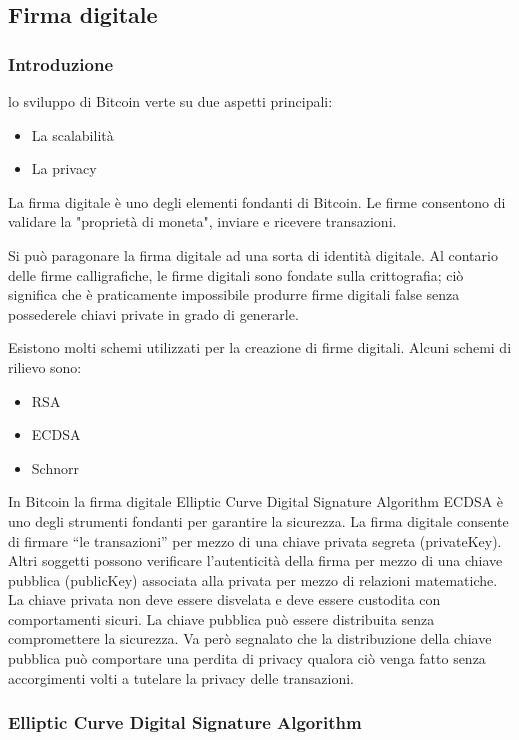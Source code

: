 \documentclass{article}
\begin{document}
\newpage
\subsection{Firma digitale}

\subsubsection{Introduzione}
lo sviluppo di Bitcoin verte su due aspetti principali:

\begin{itemize}
    \item La scalabilità
    \item La privacy
\end{itemize}

La firma digitale è uno degli elementi fondanti di Bitcoin. Le firme consentono di validare la "proprietà di moneta", inviare
e ricevere transazioni.

Si può paragonare la firma digitale ad una sorta di identità digitale. Al contario delle firme calligrafiche, le firme digitali
sono fondate sulla crittografia; ciò significa che è praticamente impossibile produrre firme digitali false senza possederele chiavi private 
in grado di generarle.

Esistono molti schemi utilizzati per la creazione di firme digitali. Alcuni schemi di rilievo sono:

\begin{itemize}
    \item RSA
    \item ECDSA
    \item Schnorr
\end{itemize}

In Bitcoin la firma digitale Elliptic Curve Digital Signature Algorithm ECDSA è uno degli strumenti fondanti per garantire la sicurezza.
La firma digitale consente di firmare “le transazioni” per mezzo di una chiave privata segreta (privateKey). Altri soggetti possono verificare l’autenticità della firma per mezzo di una chiave pubblica (publicKey) associata alla privata per mezzo di relazioni matematiche.
La chiave privata non deve essere disvelata e deve essere custodita con comportamenti sicuri.
La chiave pubblica può essere distribuita senza compromettere la sicurezza. Va però segnalato che la distribuzione della chiave pubblica può comportare una perdita di privacy qualora ciò venga fatto senza accorgimenti volti a tutelare la privacy delle transazioni.

\subsubsection{Elliptic Curve Digital Signature Algorithm}
\end{document}
